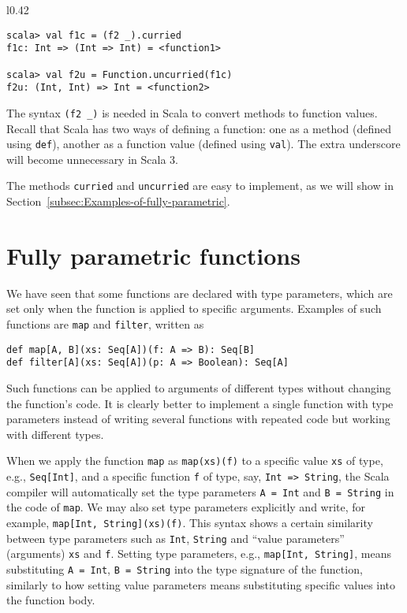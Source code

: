 \begin{wrapfigure}{l}{0.42\columnwidth}%
\vspace{-0.9\baselineskip}
\begin{lstlisting}
scala> val f1c = (f2 _).curried
f1c: Int => (Int => Int) = <function1>

scala> val f2u = Function.uncurried(f1c)
f2u: (Int, Int) => Int = <function2> 
\end{lstlisting}
\vspace{-0.95\baselineskip}
\end{wrapfigure}%

\noindent The syntax \lstinline!(f2 _)! is needed in Scala to convert
methods to function values. Recall that Scala has two ways of defining
a function: one as a method (defined using \lstinline!def!),
another as a function value (defined using
\lstinline!val!). The extra underscore will become unnecessary in
Scala 3.

The methods \lstinline!curried! and \lstinline!uncurried! are easy
to implement, as we will show in Section~\ref{subsec:Examples-of-fully-parametric}.

\section{Fully parametric functions\label{sec:Fully-parametric-functions}}

We have seen that some functions are declared with type parameters,
which are set only when the function is applied to specific arguments.
Examples of such functions are \lstinline!map! and \lstinline!filter!,
written as
\begin{lstlisting}
def map[A, B](xs: Seq[A])(f: A => B): Seq[B]
def filter[A](xs: Seq[A])(p: A => Boolean): Seq[A]
\end{lstlisting}
Such functions can be applied to arguments of different types without
changing the function\textsf{'}s code. It is clearly better to implement a
single function with type parameters instead of writing several functions
with repeated code but working with different types.

When we apply the function \lstinline!map! as \lstinline!map(xs)(f)!
to a specific value \lstinline!xs! of type, e.g., \lstinline!Seq[Int]!,
and a specific function \lstinline!f! of type, say, \lstinline!Int => String!,
the Scala compiler will automatically set the type parameters \lstinline!A = Int!
and \lstinline!B = String! in the code of \lstinline!map!. We may
also set type parameters explicitly and write, for example, \lstinline!map[Int, String](xs)(f)!.
This syntax shows a certain similarity between type parameters such
as \lstinline!Int!, \lstinline!String! and \textsf{``}value parameters\textsf{''}
(arguments) \lstinline!xs! and \lstinline!f!. Setting type parameters,
e.g., \lstinline!map[Int, String]!, means substituting \lstinline!A = Int!,
\lstinline!B = String! into the type signature of the function, similarly
to how setting value parameters means substituting specific values
into the function body.

